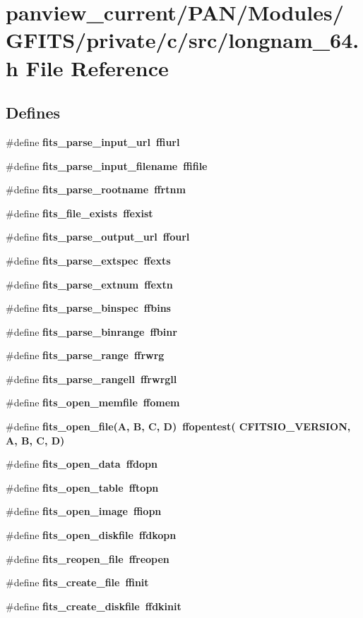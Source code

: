 \section{panview\_\-current/PAN/Modules/GFITS/private/c/src/longnam\_\-64.h File Reference}
\label{longnam__64_8h}
\subsection*{Defines}
\begin{CompactItemize}
\item 
\#define \bf{fits\_\-parse\_\-input\_\-url}~ffiurl
\item 
\#define \bf{fits\_\-parse\_\-input\_\-filename}~ffifile
\item 
\#define \bf{fits\_\-parse\_\-rootname}~ffrtnm
\item 
\#define \bf{fits\_\-file\_\-exists}~ffexist
\item 
\#define \bf{fits\_\-parse\_\-output\_\-url}~ffourl
\item 
\#define \bf{fits\_\-parse\_\-extspec}~ffexts
\item 
\#define \bf{fits\_\-parse\_\-extnum}~ffextn
\item 
\#define \bf{fits\_\-parse\_\-binspec}~ffbins
\item 
\#define \bf{fits\_\-parse\_\-binrange}~ffbinr
\item 
\#define \bf{fits\_\-parse\_\-range}~ffrwrg
\item 
\#define \bf{fits\_\-parse\_\-rangell}~ffrwrgll
\item 
\#define \bf{fits\_\-open\_\-memfile}~ffomem
\item 
\#define \bf{fits\_\-open\_\-file}(A, B, C, D)~ffopentest( CFITSIO\_\-VERSION, A, B, C, D)
\item 
\#define \bf{fits\_\-open\_\-data}~ffdopn
\item 
\#define \bf{fits\_\-open\_\-table}~fftopn
\item 
\#define \bf{fits\_\-open\_\-image}~ffiopn
\item 
\#define \bf{fits\_\-open\_\-diskfile}~ffdkopn
\item 
\#define \bf{fits\_\-reopen\_\-file}~ffreopen
\item 
\#define \bf{fits\_\-create\_\-file}~ffinit
\item 
\#define \bf{fits\_\-create\_\-diskfile}~ffdkinit
\item 

\end{CompactItemize}

